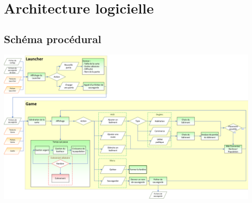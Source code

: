 \documentclass[a4paper,10pt,openany,oneside]{report}
\begin{document}
\section{Architecture logicielle}
\subsection{Schéma procédural}
\begin{center}
\includegraphics[width=\textwidth]{img/schema_proc.png}
\end{center}
\end{document}
